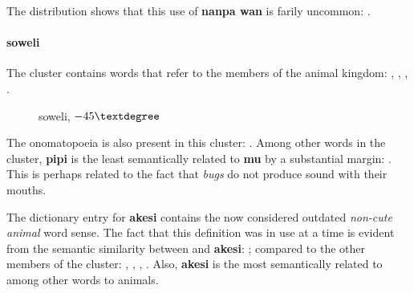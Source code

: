 \documentclass[14pt, a4paper]{extreport}
\makeatletter
\DeclareRobustCommand\ttfamily
        {\not@math@alphabet\ttfamily\mathtt
         \fontfamily\ttdefault\small\selectfont}
\makeatother
\begin{document}
The distribution shows that this use of \textbf{nanpa wan} is farily uncommon: .
        \paragraph{soweli}
The cluster  contains words that refer to the members of the animal kingdom: , , , .

\begin{figure}[ht]%
  \def\angle{-45}
  \bigskip
  \centering
  \caption{soweli, \(\angle\textdegree\)}
\end{figure}%

The onomatopoeia  is also present in this cluster: . Among other words in the cluster, \textbf{pipi} is the least semantically related to \textbf{mu} by a substantial margin: . This is perhaps related to the fact that \textit{bugs} do not produce sound with their mouths.

The dictionary entry for \textbf{akesi} contains the now considered outdated \textit{non-cute animal} word sense. The fact that this definition was in use at a time is evident from the semantic similarity between  and \textbf{akesi}: ; compared to the other members of the cluster: , , , . Also, \textbf{akesi} is the most semantically related to  among other words to animals.
\end{document}

